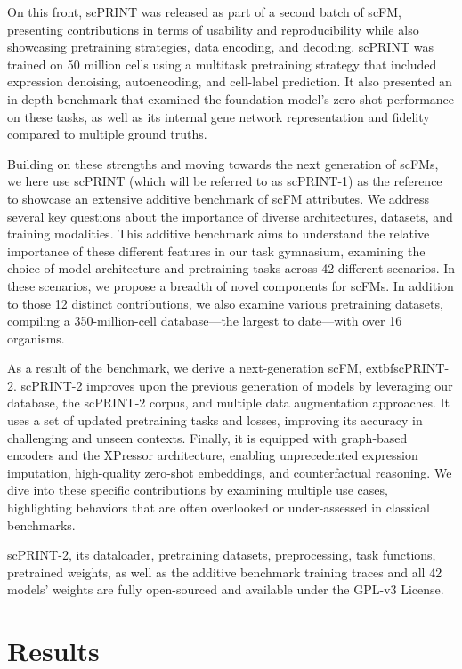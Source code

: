 On this front, scPRINT was released as part of a second batch of scFM,
presenting contributions in terms of usability and reproducibility while
also showcasing pretraining strategies, data encoding, and
decoding\citep{scprint}. scPRINT was trained on 50 million cells
using a multitask pretraining strategy that included expression
denoising, autoencoding, and cell-label prediction. It also presented an
in-depth benchmark that examined the foundation model's zero-shot
performance on these tasks, as well as its internal gene network
representation and fidelity compared to multiple ground truths.

Building on these strengths and moving towards the next generation of
\gls{scFM}s, we here use scPRINT (which will be referred to as scPRINT-1) as
the reference to showcase an extensive additive benchmark of scFM
attributes. We address several key questions about the importance of
diverse architectures, datasets, and training modalities. This additive
benchmark aims to understand the relative importance of these different
features in our task gymnasium, examining the choice of model
architecture and pretraining tasks across 42 different scenarios. In
these scenarios, we propose a breadth of novel components for \gls{scFM}s. In
addition to those 12 distinct contributions, we also examine various
pretraining datasets, compiling a 350-million-cell database---the
largest to date---with over 16 organisms.

As a result of the benchmark, we derive a next-generation scFM,
	extbf{\gls{scPRINT}-2}. \gls{scPRINT}-2 improves upon the previous generation of
models by leveraging our database, the \gls{scPRINT}-2 corpus, and multiple
data augmentation approaches. It uses a set of updated pretraining
tasks and losses, improving its accuracy in challenging and unseen
contexts. Finally, it is equipped with graph-based encoders and the
XPressor architecture, enabling unprecedented expression imputation,
high-quality zero-shot embeddings, and counterfactual reasoning. We dive
into these specific contributions by examining multiple use cases,
highlighting behaviors that are often overlooked or under-assessed in
classical benchmarks.

\gls{scPRINT}-2, its dataloader, pretraining datasets, preprocessing, task
functions, pretrained weights, as well as the additive benchmark
training traces and all 42 models'{} weights are fully
open-sourced and available under the GPL-v3 License.

\section{Results}\label{results}

